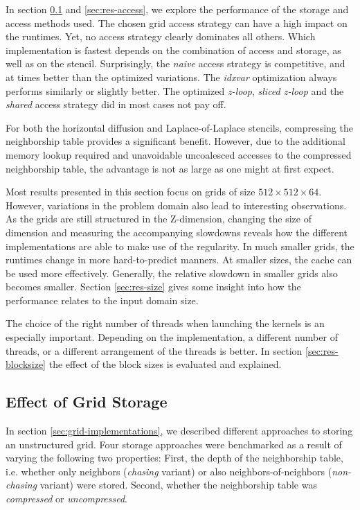 In section \ref{sec:res-storage} and \ref{sec:res-access}, we explore the performance of the storage and access methods used. The chosen grid access strategy can have a high impact on the runtimes. Yet, no access strategy clearly dominates all others. Which implementation is fastest depends on the combination of access and storage, as well as on the stencil. Surprisingly, the \emph{naive} access strategy is competitive, and at times better than the optimized variations. The \emph{idxvar} optimization always performs similarly or slightly better. The optimized \emph{z-loop}, \emph{sliced z-loop} and the \emph{shared} access strategy did in most cases not pay off.

For both the horizontal diffusion and Laplace-of-Laplace stencils, compressing the neighborship table provides a significant benefit. However, due to the additional memory lookup required and unavoidable uncoalesced accesses to the compressed neighborship table, the advantage is not as large as one might at first expect.

Most results presented in this section focus on grids of size $512\times 512\times 64$. However, variations in the problem domain also lead to interesting observations. As the grids are still structured in the Z-dimension, changing the size of dimension and measuring the accompanying slowdowns reveals how the different implementations are able to make use of the regularity. In much smaller grids, the runtimes change in more hard-to-predict manners. At smaller sizes, the cache can be used more effectively. Generally, the relative slowdown in smaller grids also becomes smaller. Section \ref{sec:res-size} gives some insight into how the performance relates to the input domain size.

The choice of the right number of threads when launching the kernels is an especially important. Depending on the implementation, a different number of threads, or a different arrangement of the threads is better. In section \ref{sec:res-blocksize} the effect of the block sizes is evaluated and explained.


\subsection{Effect of Grid Storage} \label{sec:res-storage}

In section \ref{sec:grid-implementations}, we described different approaches to storing an unstructured grid. Four storage approaches were benchmarked as a result of varying the following two properties: First, the depth of the neighborship table, i.e. whether only neighbors (\emph{chasing} variant) or also neighbors-of-neighbors (\emph{non-chasing} variant) were stored. Second, whether the neighborship table was \emph{compressed} or \emph{uncompressed}.


